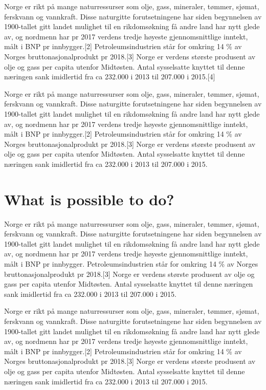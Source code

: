\documentclass{book}
\begin{document}
Norge er rikt på mange naturressurser som olje, gass, mineraler, tømmer, sjømat, ferskvann og vannkraft. Disse naturgitte forutsetningene har siden begynnelsen av 1900-tallet gitt landet mulighet til en rikdomsøkning få andre land har nytt glede av, og nordmenn har pr 2017 verdens tredje høyeste gjennomsnittlige inntekt, målt i BNP pr innbygger.[2] Petroleumsindustrien står for omkring 14 \% av Norges bruttonasjonalprodukt pr 2018.[3] Norge er verdens største produsent av olje og gass per capita utenfor Midtøsten. Antal sysselsatte knyttet til denne næringen sank imidlertid fra ca 232.000 i 2013 til 207.000 i 2015.[4]

Norge er rikt på mange naturressurser som olje, gass, mineraler, tømmer, sjømat, ferskvann og vannkraft. Disse naturgitte forutsetningene har siden begynnelsen av 1900-tallet gitt landet mulighet til en rikdomsøkning få andre land har nytt glede av, og nordmenn har pr 2017 verdens tredje høyeste gjennomsnittlige inntekt, målt i BNP pr innbygger.[2] Petroleumsindustrien står for omkring 14 \% av Norges bruttonasjonalprodukt pr 2018.[3] Norge er verdens største produsent av olje og gass per capita utenfor Midtøsten. Antal sysselsatte knyttet til denne næringen sank imidlertid fra ca 232.000 i 2013 til 207.000 i 2015.\cite{energy_2018}

\section{What is possible to do?}
Norge er rikt på mange naturressurser som olje, gass, mineraler, tømmer, sjømat, ferskvann og vannkraft. Disse naturgitte forutsetningene har siden begynnelsen av 1900-tallet gitt landet mulighet til en rikdomsøkning få andre land har nytt glede av, og nordmenn har pr 2017 verdens tredje høyeste gjennomsnittlige inntekt, målt i BNP pr innbygger.\cite{tipler} Petroleumsindustrien står for omkring 14 \% av Norges bruttonasjonalprodukt pr 2018.[3] Norge er verdens største produsent av olje og gass per capita utenfor Midtøsten. Antal sysselsatte knyttet til denne næringen sank imidlertid fra ca 232.000 i 2013 til 207.000 i 2015.\cite{energy_2018}



Norge er rikt på mange naturressurser som olje, gass, mineraler, tømmer, sjømat, ferskvann og vannkraft. Disse naturgitte forutsetningene har siden begynnelsen av 1900-tallet gitt landet mulighet til en rikdomsøkning få andre land har nytt glede av, og nordmenn har pr 2017 verdens tredje høyeste gjennomsnittlige inntekt, målt i BNP pr innbygger.[2] Petroleumsindustrien står for omkring 14 \% av Norges bruttonasjonalprodukt pr 2018.[3] Norge er verdens største produsent av olje og gass per capita utenfor Midtøsten. Antal sysselsatte knyttet til denne næringen sank imidlertid fra ca 232.000 i 2013 til 207.000 i 2015.\cite{energy_2018}

\printbibliography
\end{document}
